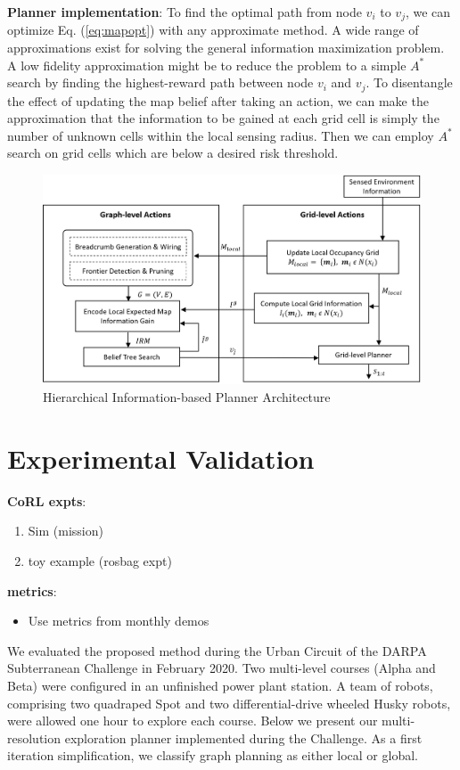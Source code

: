 \documentclass{article}
\newcommand{\ph}[1]{{\textbf{#1}:}} %
\begin{document}
\ph{Planner implementation}
To find the optimal path from node $v_i$ to $v_j$, we can optimize Eq. (\ref{eq:mapopt}) with any approximate method.  A wide range of approximations exist for solving the general information maximization problem.  A low fidelity approximation might be to reduce the problem to a simple $A^*$ search by finding the highest-reward path between node $v_i$ and $v_j$.  To disentangle the effect of updating the map belief after taking an action, we can make the approximation that the information to be gained at each grid cell is simply the number of unknown cells within the local sensing radius.  Then we can employ $A^*$ search on grid cells which are below a desired risk threshold.

\begin{figure}[t!]
  \includegraphics[width=.48\textwidth]{figures/structure_v5.png}
  \centering
  \caption{Hierarchical Information-based Planner Architecture}
  \label{fig:architecture}
\end{figure}

\section{Experimental Validation}\label{sec:urban}

\ph{CoRL expts}
\begin{enumerate}
    \item Sim (mission)
    \item toy example (rosbag expt)
\end{enumerate}

\ph{metrics}
\begin{itemize}
    \item Use metrics from monthly demos
\end{itemize}

We evaluated the proposed method during the Urban Circuit of the DARPA Subterranean Challenge in February 2020. Two multi-level courses (Alpha and Beta) were configured in an unfinished power plant station. A team of robots, comprising two quadraped Spot and two differential-drive wheeled Husky robots, were allowed one hour to explore each course. Below we present our multi-resolution exploration planner implemented during the Challenge. As a first iteration simplification, we classify graph planning as either local or global. 
\end{document}
